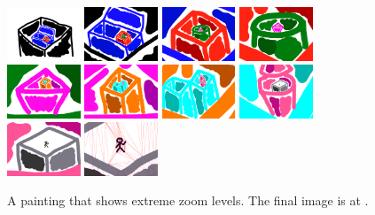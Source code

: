 \documentclass[review]{acmsiggraph}
\begin{document}
\begin{figure}
    \centering
        \includegraphics[width=0.195\textwidth]{images/zoom61}
        \includegraphics[width=0.195\textwidth]{images/zoom62}
        \includegraphics[width=0.195\textwidth]{images/zoom63}
        \includegraphics[width=0.195\textwidth]{images/zoom64}
        \includegraphics[width=0.195\textwidth]{images/zoom65}
        \includegraphics[width=0.195\textwidth]{images/zoom66}
        \includegraphics[width=0.195\textwidth]{images/zoom67}
        \includegraphics[width=0.195\textwidth]{images/zoom68}
        \includegraphics[width=0.195\textwidth]{images/zoom69}
        \includegraphics[width=0.195\textwidth]{images/zoom71}
    \caption{A painting that shows extreme zoom levels.  The final image is at .}
\end{figure}
\end{document}
